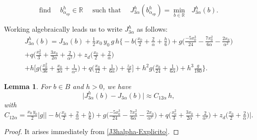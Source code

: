 \documentclass[11pt]{article}
\newtheorem{Lemma}{Lemma}
\begin{document}
$$ \text{find }\quad {b^h_{\alpha_{op}}}\in \mathbb{R}\quad\text{ such that }\quad
{J^h_{3\alpha}}({b^h_{\alpha_{op}}})=\min\limits_{b\in \mathbb{R}} \text{ }{J^h_{3\alpha}}(b).
$$

Working algebraically leads us to write ${J^h_{3\alpha}}$ as follows:
  \begin{equation}\label{J3halpha-Explicito}
  \begin{array}{ll}
 { J^h_{3\alpha}}(b)= J_{3\alpha}(b) + \tfrac{1}{2} x_0\,y_0 \,g \,h \Big \{- b \Big(  \tfrac{x_0}{2} + \tfrac{2}{\alpha}  + \tfrac{h}{6}\Big)
  + g \Big( \tfrac{-5 x_0^3}{24} -  \tfrac{7 x_0^2}{6 \alpha} -  \tfrac{2 x_0}{\alpha^2} \Big)\\[0.45cm]
  + q \Big(  \tfrac{x_0^2}{3} +  \tfrac{3 x_0}{2 \alpha} +  \tfrac{2}{\alpha^2}\Big) + z_d \Big(  \tfrac{x_0}{2} +  \tfrac{2}{\alpha}\Big) \\[0.45cm]
  + h \Big[ g \Big(  \tfrac{x_0^2}{36} +  \tfrac{x_0}{3 \alpha} +  \tfrac{1}{\alpha^2}\Big) + q \Big(  \tfrac{x_0}{12} + \tfrac{1}{6 \alpha}\Big) + \tfrac{z_d}{6} \Big]
 + h^2 g \Big(  \tfrac{x_0}{24} +  \tfrac{1}{6 \alpha}\Big) + h^3 \tfrac{g}{180} \Big\}.
 \end{array}
 \end{equation}
        
  \vspace{.4cm}

  \begin{Lemma} For $b\in B$ and $h>0$, we have
\begin{equation}    \label{J3halpha-J3alpha}
 \lvert  { J^h_{3\alpha}}(b) - J_{3\alpha}(b) \rvert  \approx C_{12\alpha} \, h ,
\end{equation}
with $$C_{12\alpha}=\tfrac{x_0\,y_0}{2}  |g|  \Big\lvert- b \Big(  \tfrac{x_0}{2} + \tfrac{2}{\alpha}  + \tfrac{h}{6}\Big)
  + g \Big( \tfrac{-5 x_0^3}{24} -  \tfrac{7 x_0^2}{6 \alpha} -  \tfrac{2 x_0}{\alpha^2} \Big)
  + q \Big(  \tfrac{x_0^2}{3} +  \tfrac{3 x_0}{2 \alpha} +  \tfrac{2}{\alpha^2}\Big) + z_d \Big(  \tfrac{x_0}{2} +  \tfrac{2}{\alpha}\Big)\Big\rvert.$$
  \end{Lemma}
  \begin{proof}
  It arises immediately from \eqref{J3halpha-Explicito}.
  \end{proof}
  
\end{document}
